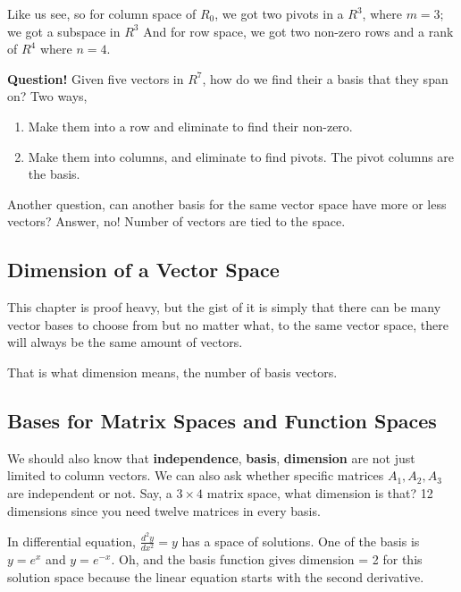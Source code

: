 Like us see, so for column space of \(R_0\), we got two pivots in a \(R^3\), where \(m = 3\); we got a subspace in \(R^3\)  And for row space, we got two non-zero rows and a rank of \(R^4\) where \(n = 4\). 

\textbf{Question!} Given five vectors in \(R^7\), how do we find their a basis that they span on? 
Two ways,
\begin{enumerate}
    \item Make them into a row and eliminate to find their non-zero. 
    \item Make them into columns, and eliminate to find pivots. The pivot columns are the basis. 
\end{enumerate}  

Another question, can another basis for the same vector space have more or less vectors? Answer, no! Number of vectors are tied to the space. 

\subsection{Dimension of a Vector Space}

This chapter is proof heavy, but the gist of it is simply that there can be many vector bases to choose from but no matter what, to the same vector space, there will always be the same amount of vectors. 

That is what dimension means, the number of basis vectors. 

\subsection{Bases for Matrix Spaces and Function Spaces}

We should also know that \textbf{independence}, \textbf{basis}, \textbf{dimension} are not just limited to column vectors. We can also ask whether specific matrices \(A_1, A_2, A_3\) are independent or not. Say, a \(3 \times 4\) matrix space, what dimension is that? 12 dimensions since you need twelve matrices in every basis. 

In differential equation, \(\frac{d^{2}y}{dx^2} = y\) has a space of solutions. One of the basis is \(y = e^x\) and \(y = e^{-x}\). Oh, and the basis function gives dimension = 2 for this solution space because the linear equation starts with the second derivative. 

